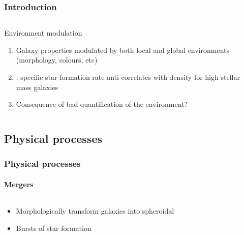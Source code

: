 \begin{frame}
    \frametitle{Introduction}
    \begin{columns}
        \begin{column}{0.5\textwidth}
            \begin{block}{Environment modulation}
                \begin{enumerate}
                    \item<1-> Galaxy properties modulated by both local and
                        global environments (morphology, colours, etc)
                    \item<2-> \citet{Peng+11}: specific star formation rate
                        anti-correlates with density for high stellar mass
                        galaxies
                    \item<3-> Consequence of bad quantification of the
                        environment?
                \end{enumerate}
            \end{block}
        \end{column}
        \begin{column}{0.5\textwidth}
            \begin{minipage}[c][0.6\textheight][c]{\linewidth}
            \end{minipage}
        \end{column}
    \end{columns}
\end{frame}

\subsection{Physical processes}

\begin{frame}
    \frametitle{Physical processes}
    \framesubtitle{Mergers}
    \begin{columns}
        \begin{column}{0.5\textwidth}
            \begin{block}{}
                \begin{itemize}
                    \item<1-> Morphologically transform galaxies into
                        spheroidal
                    \item<2-> Bursts of star formation
                \end{itemize}
            \end{block}
        \end{column}
        \begin{column}{0.5\textwidth}
        \end{column}
    \end{columns}
\end{frame}

